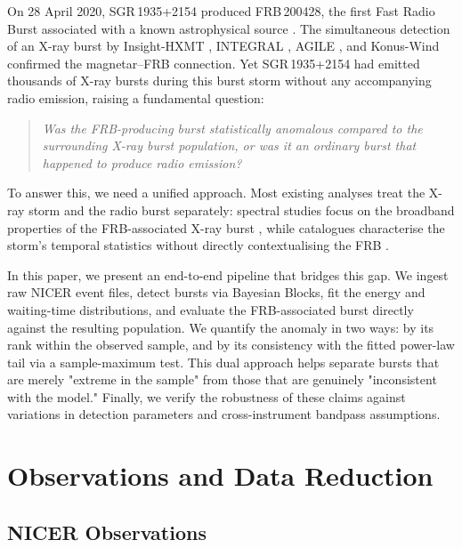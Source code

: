 \documentclass[12pt]{article}
\begin{document}
On 28 April 2020, SGR\,1935+2154 produced FRB\,200428, the first Fast
Radio Burst associated with a known astrophysical source
\citep{bochenek2020, chime2020}. The simultaneous detection of an X-ray
burst by Insight-HXMT \citep{li2021}, INTEGRAL \citep{mereghetti2020},
AGILE \citep{tavani2021}, and Konus-Wind \citep{ridnaia2021} confirmed
the magnetar--FRB connection. Yet SGR\,1935+2154 had emitted thousands of
X-ray bursts during this burst storm without any accompanying radio
emission, raising a fundamental question:

\begin{quote}
\textit{Was the FRB-producing burst statistically anomalous compared to the
surrounding X-ray burst population, or was it an ordinary burst that
happened to produce radio emission?}
\end{quote}

To answer this, we need a unified approach. Most existing analyses treat the X-ray storm and the radio burst separately: spectral studies focus on the broadband properties of the FRB-associated X-ray burst \citep{li2021, mereghetti2020}, while catalogues characterise the storm's temporal statistics without directly contextualising the FRB \citep{younes2020}. 

In this paper, we present an end-to-end pipeline that bridges this gap. We ingest raw NICER event files, detect bursts via Bayesian Blocks, fit the energy and waiting-time distributions, and evaluate the FRB-associated burst directly against the resulting population. We quantify the anomaly in two ways: by its rank within the observed sample, and by its consistency with the fitted power-law tail via a sample-maximum test. This dual approach helps separate bursts that are merely "extreme in the sample" from those that are genuinely "inconsistent with the model." Finally, we verify the robustness of these claims against variations in detection parameters and cross-instrument bandpass assumptions.

\section{Observations and Data Reduction}\label{sec:data}

\subsection{NICER Observations}
\end{document}
